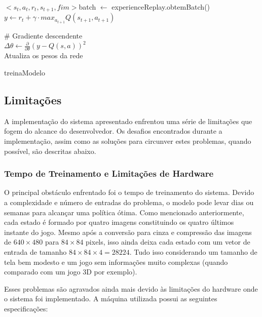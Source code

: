   \begin{algorithm}[H]
    \SetAlgoLined
    $<s_t,a_t,r_t,s_{t+1},fim>$batch  $\leftarrow$ experienceReplay.obtemBatch()\\
    {
      $y \leftarrow r_t + \gamma\cdot max_{a_{t+1}}Q(s_{t+1},a_{t+1})$
    }

    \# Gradiente descendente\\
    $\Delta\theta\leftarrow\frac{\partial}{\partial\theta}(y - Q(s,a))^2$\\[.3cm]

    Atualiza os pesos da rede
   \caption{treinaModelo}
   \label{alg:train}
  \end{algorithm}





\subsection{Limitações} %
\label{sub:limitacoes}

A implementação do sistema apresentado enfrentou uma série de limitações que fogem do alcance do desenvolvedor. Os desafios encontrados durante a implementação, assim como as soluções para circunver estes problemas, quando possível, são descritas abaixo.

\subsubsection{Tempo de Treinamento e Limitações de Hardware} %
\label{subsub:tempo_de_treinamento_e_limitações_de_hardware}

O principal obstáculo enfrentado foi o tempo de treinamento do sistema. Devido a complexidade e número de entradas do problema, o modelo pode levar dias ou semanas para alcançar uma política ótima. Como mencionado anteriormente, cada estado é formado por quatro imagens constituindo os quatro últimos instante do jogo. Mesmo após a conversão para cinza e compressão das imagens de $640\times480$ para $84\times84$ pixels, isso ainda deixa cada estado com um vetor de entrada de tamanho $84\times84\times4=28224$. Tudo isso considerando um tamanho de tela bem modesto e um jogo sem informações muito complexas (quando comparado com um jogo 3D por exemplo).

Esses problemas são agravados ainda mais devido às limitações do hardware onde o sistema foi implementado. A máquina utilizada possui as seguintes especificações:


